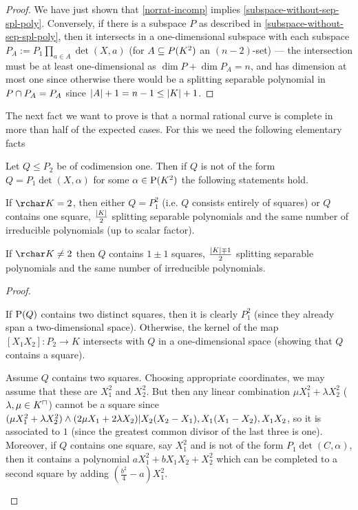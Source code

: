 \begin{proof}
    We have just shown that \autoref{norrat-incomp} implies \autoref{subspace-without-sep-spl-poly}. Conversely, if there is a subspace $P$ as described in \autoref{subspace-without-sep-spl-poly}, then it intersects in a one-dimensional subspace with each subspace $P_A:=P_1\prod_{a\in A}{\det(X,a)}$ (for $A\subseteq P(K^2)$ an $(n-2)$-set) --- the intersection must be at least one-dimensional as $\dim P +\dim P_A=n$, and has dimension at most one since otherwise there would be a splitting separable polynomial in $P\cap P_A=P_A$ since $\left|A\right| + 1 = n-1\leq \left|K\right|+1$.
\end{proof}


The next fact we want to prove is that a normal rational curve is complete in more than half of the expected cases.
For this we need the following elementary facts

\begin{lemma}
    Let $Q\leq P_2$ be of codimension one. Then if $Q$ is not of the form $Q=P_1\det(X,\alpha)$ for some $\alpha\in\P(K^2)$ the following statements hold.
    \begin{statements}
            \item If $\rchar K = 2$, then either $Q=P_1^2$ (i.e. $Q$ consists entirely of squares) or $Q$ contains one square, $\frac{\left|K\right|} 2$ splitting separable polynomials and the same number of irreducible polynomials (up to scalar factor).
        \item If $\rchar K \neq 2$ then $Q$ contains $1\pm 1$ squares, $\frac{\left|K\right| \mp 1} 2$ splitting separable polynomials and the same number of irreducible polynomials.
    \end{statements}
\end{lemma}

\begin{proof}
    \begin{statements}
            \item If $\P(Q)$ contains two distinct squares, then it is clearly $P_1^2$ (since they already span a two-dimensional space). Otherwise, the kernel of the map $[X_1X_2]:P_2\to K$ intersects with $Q$ in a one-dimensional space (showing that $Q$ contains a square).
            \item Assume $Q$ contains two squares. Choosing appropriate coordinates, we may assume that these are $X_1^2$ and $X_2^2$. But then any linear combination $\mu X_1^2+\lambda X_2^2$ ($\lambda,\mu\in\units K$) cannot be a square since $(\mu X_1^2+\lambda X_2^2)\wedge (2\mu X_1+2\lambda X_2)| X_2(X_2-X_1),X_1(X_1-X_2),X_1X_2$, so it is associated to $1$ (since the greatest common divisor of the last three is one).
        Moreover, if $Q$ contains one square, say $X_1^2$ and is not of the form $P_1\det(C,\alpha)$, then it contains a polynomial $aX_1^2+bX_1X_2+X_2^2$ which can be completed to a second square by adding $\left(\frac{b^2} 4 -a\right)X_1^2$.
    \end{statements}
\end{proof}

